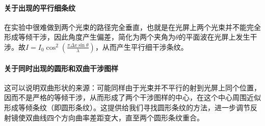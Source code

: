 \documentclass[10pt]{ctexart}
\begin{document}
\paragraph{关于出现的平行细条纹}在实验中很难做到两个光束的路径完全垂直，也就是在光屏上两个光束并不能完全形成等倾干涉，因此角度产生偏差，简化为两个夹角为$\theta$的平面波在光屏上发生干涉。故$I=I_0\cos^2(\frac{\pi \Delta x\sin\theta}{\lambda})$，从而产生平行细干涉条纹。
\paragraph{关于同时出现的圆形和双曲干涉图样}这可以说明双曲形状的来源：可能同样由于光束并不平行的射到光屏上同个位置，因而不是严格的等倾干涉，从而形成了两个干涉图样的中心，在这个中心周围近似形成等倾条纹（即圆形条纹）。这提供给我们寻找圆形条纹的方法，进一步调节反射镜使双曲线四个方向曲率差距变大，直至两个圆形条纹重合。
\end{document}
